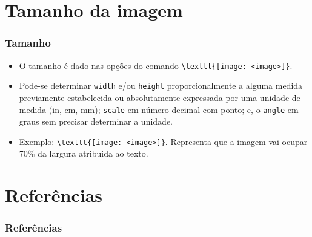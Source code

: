 \documentclass{beamer}
\begin{document}
\section{Tamanho da imagem}
\begin{frame}[fragile]
    \frametitle{Tamanho}

    \begin{itemize}
        \item O tamanho é dado nas opções do comando \lstinline[style=myStyleLatex]!\texttt{[image: <image>]}!.
        \item Pode-se determinar \texttt{width} e/ou \texttt{height} proporcionalmente a alguma medida previamente estabelecida ou absolutamente expressada por uma unidade de medida (in, cm, mm); \texttt{scale} em número decimal com ponto; e, o \texttt{angle} em graus sem precisar determinar a unidade.
        \item Exemplo: \lstinline[style=myStyleLatex]!\texttt{[image: <image>]}!. Representa que a imagem vai ocupar 70\% da largura atribuida ao texto.
    \end{itemize}

\end{frame}


\section{Referências}
\begin{frame}[allowframebreaks]
    \frametitle{Referências}
    \nocite{*}
    \printbibliography[keyword={inserirImagem}]
\end{frame}
\end{document}
